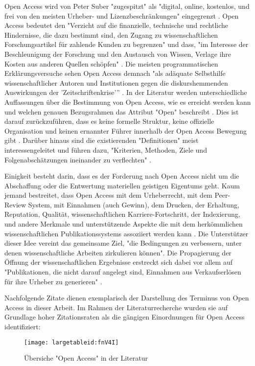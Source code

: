 Open Access wird von Peter Suber "zugespitzt" \cite{naeder_2010_open} als "digital, online, kostenlos, und frei von den meisten Urheber- und Lizenzbeschränkungen" \cite{suber_2012_open} eingegrenzt \cite{Adema_2014_open_access}. Open Access bedeutet den "Verzicht auf die finanzielle, technische und rechtliche Hindernisse, die dazu bestimmt sind, den Zugang zu wissenschaftlichen Forschungsartikel für zahlende Kunden zu begrenzen" und dass, "im Interesse der Beschleunigung der Forschung und den Austausch von Wissen, Verlage ihre Kosten aus anderen Quellen schöpfen" \cite{Suber_2002}. Die meisten programmatischen Erklärungsversuche sehen Open Access demnach "als adäquate Selbsthilfe wissenschaftlicher Autoren und Institutionen gegen die diskurshemmenden Auswirkungen der 'Zeitschriftenkrise'” \cite{naeder_2010_open}. In der Literatur werden unterschiedliche Auffassungen über die Bestimmung von Open Access, wie es erreicht werden kann und welchen genauen Bezugsrahmen das Attribut "Open" beschreibt \cite{Adema_2014_open_access} \cite{cite:17}. Dies ist darauf zurückzuführen, dass es keine formelle Struktur, keine offizielle Organisation und keinen ernannter Führer innerhalb der Open Access Bewegung gibt \cite{poynder_2011_suber}. Darüber hinaus sind die existierenden "Definitionen" meist interessengeleitet und führen dazu, "Kriterien, Methoden, Ziele und Folgenabschätzungen ineinander zu verflechten" \cite{naeder_2010_open}.

Einigkeit besteht darin, dass es der Forderung nach Open Access nicht um die Abschaffung oder die Entwertung materiellen geistigen Eigentums geht. Kaum jemand bestreitet, dass Open Access mit dem Urheberrecht, mit dem Peer-Review System, mit Einnahmen (auch Gewinn), dem Drucken, der Erhaltung, Reputation, Qualität, wissenschaftlichen Karriere-Fortschritt, der Indexierung, und andere Merkmale und unterstützende Aspekte die mit dem herkömmlichen wissenschaftlichen Publikationssystems assoziiert werden kann \cite{suber_2015}. Die Unterstützer dieser Idee vereint das gemeinsame Ziel, "die Bedingungen zu verbessern, unter denen wissenschaftliche Arbeiten zirkulieren können"\cite{Adema_2014_open_access}. Die Propagierung der Öffnung der wissenschaftlichen Ergebnisse erstreckt sich dabei vor allem auf "Publikationen, die nicht darauf angelegt sind, Einnahmen aus Verkaufserlösen für ihre Urheber zu generieren" \cite{muller_2010_open}.

Nachfolgende Zitate dienen exemplarisch der Darstellung des Terminus von Open Access in dieser Arbeit. Im Rahmen der Literaturrecherche wurden sie auf Grundlage hoher Zitationsraten als die gängigen Einordnungen für Open Access identifiziert:
\begin{figure}[h!]
\texttt{[image: largetableid:fnV4I]}
\caption{Übersiche "Open Access" in der Literatur}
\end{figure}

